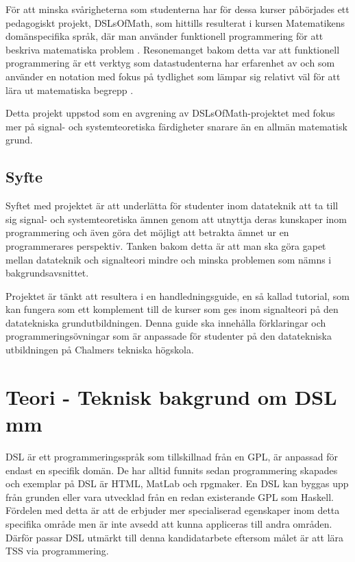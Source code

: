 \documentclass[]{article}
\begin{document}
För att minska svårigheterna som studenterna har för dessa kurser påbörjades
ett pedagogiskt projekt, DSLsOfMath, som hittills resulterat i kursen
Matematikens domänspecifika språk, där man använder funktionell
programmering för att beskriva matematiska problem \cite{kursplan:dslsofmath}.
Resonemanget bakom detta var att funktionell programmering är ett verktyg
som datastudenterna har erfarenhet av och som använder en notation med
fokus på tydlighet som lämpar sig relativt väl för att lära ut matematiska
begrepp \cite{tfpie}.

Detta projekt uppstod som en avgrening av DSLsOfMath-projektet med fokus mer på signal- och systemteoretiska färdigheter snarare än en allmän matematisk grund.

\subsection{Syfte}

% 

Syftet med projektet är att underlätta för studenter inom datateknik att
ta till sig signal- och systemteoretiska ämnen genom att utnyttja deras
kunskaper inom programmering och även göra det möjligt att betrakta ämnet ur
en programmerares perspektiv. Tanken bakom detta är att man ska göra gapet
mellan datateknik och signalteori mindre och minska problemen som nämns
i bakgrundsavsnittet.

Projektet är tänkt att resultera i en handledningsguide, en så kallad
tutorial, som kan fungera som ett komplement till de kurser som ges inom
signalteori på den datatekniska grundutbildningen. Denna guide ska innehålla
förklaringar och programmeringsövningar som är anpassade för studenter på den
datatekniska utbildningen på Chalmers tekniska högskola.

\section{Teori - Teknisk bakgrund om DSL mm}

DSL är ett programmeringsspråk som tillskillnad från en GPL, är anpassad
för endast en specifik domän. De har alltid funnits sedan programmering 
skapades och exemplar på DSL är HTML, MatLab och rpgmaker. En DSL kan 
byggas upp från grunden eller vara utvecklad från en redan existerande GPL
som Haskell. Fördelen med detta är att de erbjuder mer specialiserad egenskaper 
inom detta specifika område men är inte avsedd att kunna appliceras till andra
områden. Därför passar DSL utmärkt till denna kandidatarbete eftersom målet är 
att lära TSS via programmering. 
\end{document}
